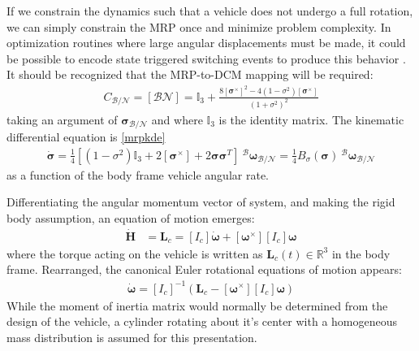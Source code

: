 \documentclass[conf]{new-aiaa}
\begin{document}
If we constrain the dynamics such that a vehicle does not undergo a full rotation, we can simply constrain the MRP once and minimize problem complexity. In optimization routines where large angular displacements must be made, it could be possible to encode state triggered switching events to produce this behavior \cite{szmuk2019successive}. It should be recognized that the MRP-to-DCM mapping will be required:
\begin{align}
\label{mrp2c}
	C_{\mathcal{B/N}} = [\mathcal{BN}]= \mathbb{I}_3 +  \frac{8[\boldsymbol{\sigma}^\times]^2 - 4(1-\sigma^2)[\boldsymbol{\sigma}^\times]}{(1+\sigma^2)^2}
\end{align}
taking an argument of $\boldsymbol{\sigma}_\mathcal{B/N}$ and where $\mathbb{I}_3$ is the identity matrix. The kinematic differential equation is \ref{mrpkde}
%
\begin{align}
\label{mrpkde}
	\dot{\boldsymbol{\sigma}} = \frac{1}{4}[(1-\sigma^2)\mathbb{I}_3 +  2[\boldsymbol{\sigma}^\times] + 2\boldsymbol{\sigma}\boldsymbol{\sigma}^T] \ ^\mathcal{B}\boldsymbol{\omega}_\mathcal{B/N} = \frac{1}{4}B_\sigma(\boldsymbol{\sigma}) \ ^\mathcal{B}\boldsymbol{\omega}_\mathcal{B/N}
\end{align}
as a function of the body frame vehicle angular rate.

Differentiating the angular momentum vector of system, and making the rigid body assumption, an equation of motion emerges:
\begin{align}
\dot{\bm{H}} &= \mathbf{L}_c = [I_c]\dot{\boldsymbol{\omega}} + [\boldsymbol{\omega}^\times][I_c]\boldsymbol{\omega}
\end{align}
where the torque acting on the vehicle is written as $\mathbf{L}_c(t) \in \mathbb{R}^3$ in the body frame. Rearranged, the canonical Euler rotational equations of motion appears:
\begin{align}
	\dot{\boldsymbol{\omega}} = [I_c]^{-1}(\mathbf{L}_c - [\boldsymbol{\omega}^\times][I_c]\boldsymbol{\omega})
\end{align}
While the moment of inertia matrix would normally be determined from the design of the vehicle, a cylinder rotating about it's center with a homogeneous mass distribution is assumed for this presentation.
\end{document}
